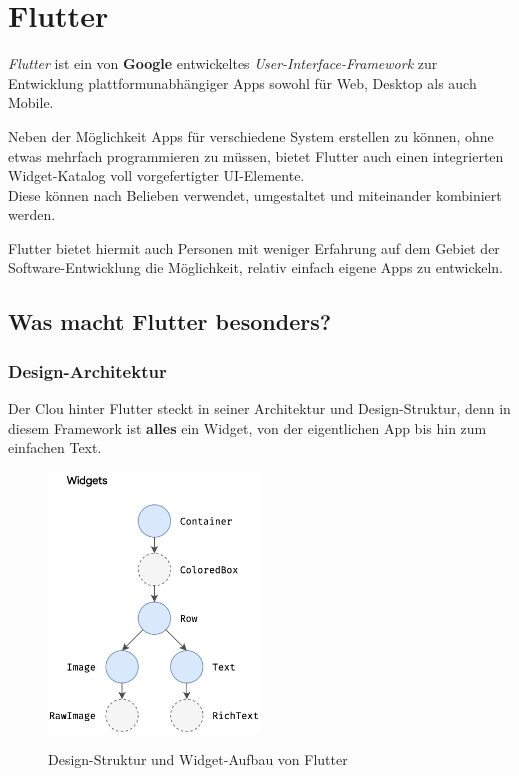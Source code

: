 \section{Flutter}

\textit{Flutter} ist ein von \textbf{Google} entwickeltes \textit{User-Interface-Framework} zur
Entwicklung plattformunabhängiger Apps sowohl für Web, Desktop als auch Mobile.

Neben der Möglichkeit Apps für verschiedene System erstellen zu können, ohne etwas mehrfach programmieren
zu müssen, bietet Flutter auch einen integrierten Widget-Katalog voll vorgefertigter UI-Elemente.\\
Diese können nach Belieben verwendet, umgestaltet und miteinander kombiniert werden.

Flutter bietet hiermit auch Personen mit weniger Erfahrung auf dem Gebiet der Software-Entwicklung
die Möglichkeit, relativ einfach eigene Apps zu entwickeln.

\subsection{Was macht Flutter besonders?}

\subsubsection{Design-Architektur}

Der Clou hinter Flutter steckt in seiner Architektur und Design-Struktur, denn in diesem Framework ist \textbf{alles} ein Widget,
von der eigentlichen App bis hin zum einfachen Text.

\begin{figure}[H]
    \begin{center}
        \includegraphics[width=0.5\textwidth]{images/Flutter/design-structure.png}
        \caption{Design-Struktur und Widget-Aufbau von Flutter}
        \cite{flutterDesignArchitecture}
    \end{center}
\end{figure}

